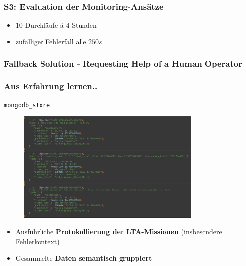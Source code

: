 \documentclass{beamer}
\newcommand{\code}[1]{\colorbox{light-gray}{\texttt{#1}}}
\begin{document}
\begin{frame}
  \frametitle{S3: Evaluation der Monitoring-Ansätze}
  \begin{itemize}
    \item $10$ Durchläufe á $4$ Stunden
    \item zufälliger Fehlerfall alle $250s$
  \end{itemize}
\end{frame}

\begin{frame}
  \frametitle{Fallback Solution - Requesting Help of a Human Operator}
\end{frame}

\begin{frame}
  \frametitle{Aus Erfahrung lernen..}
  \code{mongodb\_store}
  \begin{figure}[H]
    \centering
    \includegraphics[width=0.8\textwidth]{img/database_entries.png}
  \end{figure}
  \begin{itemize}
    \item Ausführliche \textbf{Protokollierung der LTA-Missionen} (insbesondere Fehlerkontext)
    \item Gesammelte \textbf{Daten semantisch gruppiert}
  \end{itemize}
\end{frame}


\end{document}
